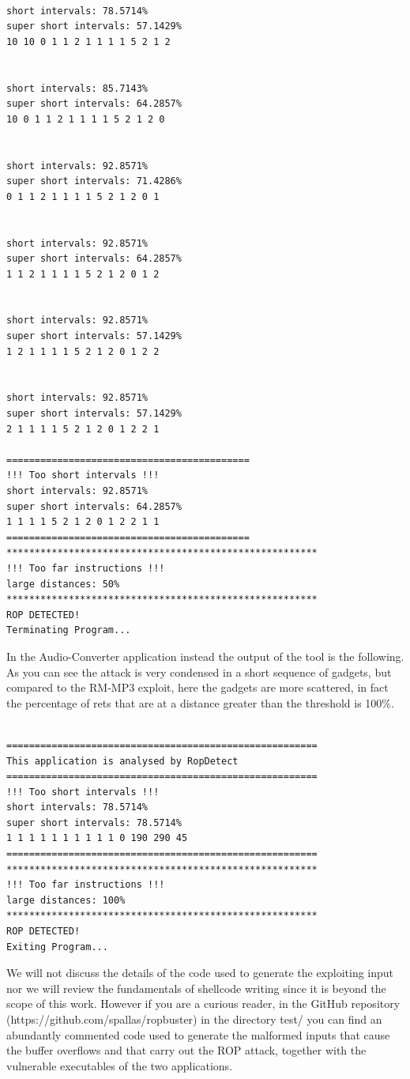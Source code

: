 \documentclass[Lau,binding=0.6cm]{sapthesis}
\begin{document}
\begin{verbatim}

short intervals: 78.5714%
super short intervals: 57.1429%
10 10 0 1 1 2 1 1 1 1 5 2 1 2


short intervals: 85.7143%
super short intervals: 64.2857%
10 0 1 1 2 1 1 1 1 5 2 1 2 0


short intervals: 92.8571%
super short intervals: 71.4286%
0 1 1 2 1 1 1 1 5 2 1 2 0 1


short intervals: 92.8571%
super short intervals: 64.2857%
1 1 2 1 1 1 1 5 2 1 2 0 1 2


short intervals: 92.8571%
super short intervals: 57.1429%
1 2 1 1 1 1 5 2 1 2 0 1 2 2


short intervals: 92.8571%
super short intervals: 57.1429%
2 1 1 1 1 5 2 1 2 0 1 2 2 1

===========================================
!!! Too short intervals !!!
short intervals: 92.8571%
super short intervals: 64.2857%
1 1 1 1 5 2 1 2 0 1 2 2 1 1
===========================================
*******************************************************
!!! Too far instructions !!!
large distances: 50%
*******************************************************
ROP DETECTED!
Terminating Program...

\end{verbatim}



In the Audio-Converter application instead the output of the tool is the following. As you can see the attack is very condensed in a short sequence of gadgets, but compared to the RM-MP3 exploit, here the gadgets are more scattered, in fact the percentage of rets that are at a distance greater than the threshold is 100\%.

\begin{verbatim}

=======================================================
This application is analysed by RopDetect
=======================================================
!!! Too short intervals !!!
short intervals: 78.5714%
super short intervals: 78.5714%
1 1 1 1 1 1 1 1 1 1 0 190 290 45
=======================================================
*******************************************************
!!! Too far instructions !!!
large distances: 100%
*******************************************************
ROP DETECTED!
Exiting Program...

\end{verbatim}

We will not discuss the details of the code used to generate the exploiting input nor we will review the fundamentals of shellcode writing since it is beyond the scope of this work. However if you are a curious reader, in the GitHub repository (https://github.com/spallas/ropbuster) in the directory test/ you can find an abundantly commented code used to generate the malformed inputs that cause the buffer overflows and that carry out the ROP attack, together with the vulnerable executables of the two applications.
\end{document}
